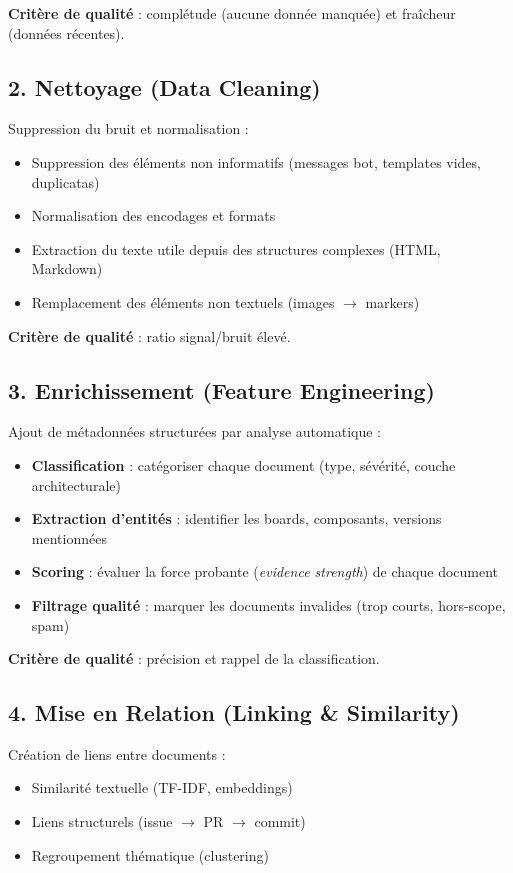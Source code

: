 \documentclass[12pt,a4paper]{report}
\begin{document}
\textbf{Critère de qualité} : complétude (aucune donnée manquée) et fraîcheur (données récentes).

\subsection{2. Nettoyage (Data Cleaning)}

Suppression du bruit et normalisation :
\begin{itemize}
  \item Suppression des éléments non informatifs (messages bot, templates vides, duplicatas)
  \item Normalisation des encodages et formats
  \item Extraction du texte utile depuis des structures complexes (HTML, Markdown)
  \item Remplacement des éléments non textuels (images $\to$ markers)
\end{itemize}

\textbf{Critère de qualité} : ratio signal/bruit élevé.

\subsection{3. Enrichissement (Feature Engineering)}

Ajout de métadonnées structurées par analyse automatique :
\begin{itemize}
  \item \textbf{Classification} : catégoriser chaque document (type, sévérité, couche architecturale)
  \item \textbf{Extraction d'entités} : identifier les boards, composants, versions mentionnées
  \item \textbf{Scoring} : évaluer la force probante (\textit{evidence strength}) de chaque document
  \item \textbf{Filtrage qualité} : marquer les documents invalides (trop courts, hors-scope, spam)
\end{itemize}

\textbf{Critère de qualité} : précision et rappel de la classification.

\subsection{4. Mise en Relation (Linking \& Similarity)}

Création de liens entre documents :
\begin{itemize}
  \item Similarité textuelle (TF-IDF, embeddings)
  \item Liens structurels (issue $\to$ PR $\to$ commit)
  \item Regroupement thématique (clustering)
\end{itemize}
\end{document}
